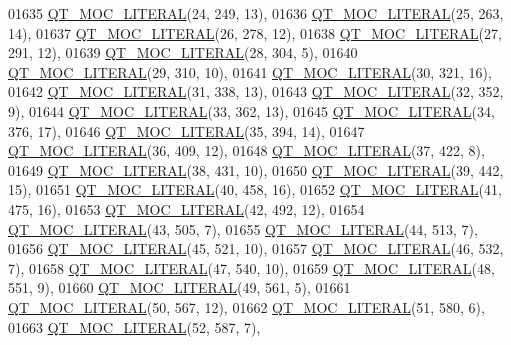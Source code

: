 \begin{DoxyCode}
01635 \hyperlink{a00016_a75bb9482d242cde0a06c9dbdc6b83abe}{QT\_MOC\_LITERAL}(24, 249, 13),
01636 \hyperlink{a00016_a75bb9482d242cde0a06c9dbdc6b83abe}{QT\_MOC\_LITERAL}(25, 263, 14),
01637 \hyperlink{a00016_a75bb9482d242cde0a06c9dbdc6b83abe}{QT\_MOC\_LITERAL}(26, 278, 12),
01638 \hyperlink{a00016_a75bb9482d242cde0a06c9dbdc6b83abe}{QT\_MOC\_LITERAL}(27, 291, 12),
01639 \hyperlink{a00016_a75bb9482d242cde0a06c9dbdc6b83abe}{QT\_MOC\_LITERAL}(28, 304, 5),
01640 \hyperlink{a00016_a75bb9482d242cde0a06c9dbdc6b83abe}{QT\_MOC\_LITERAL}(29, 310, 10),
01641 \hyperlink{a00016_a75bb9482d242cde0a06c9dbdc6b83abe}{QT\_MOC\_LITERAL}(30, 321, 16),
01642 \hyperlink{a00016_a75bb9482d242cde0a06c9dbdc6b83abe}{QT\_MOC\_LITERAL}(31, 338, 13),
01643 \hyperlink{a00016_a75bb9482d242cde0a06c9dbdc6b83abe}{QT\_MOC\_LITERAL}(32, 352, 9),
01644 \hyperlink{a00016_a75bb9482d242cde0a06c9dbdc6b83abe}{QT\_MOC\_LITERAL}(33, 362, 13),
01645 \hyperlink{a00016_a75bb9482d242cde0a06c9dbdc6b83abe}{QT\_MOC\_LITERAL}(34, 376, 17),
01646 \hyperlink{a00016_a75bb9482d242cde0a06c9dbdc6b83abe}{QT\_MOC\_LITERAL}(35, 394, 14),
01647 \hyperlink{a00016_a75bb9482d242cde0a06c9dbdc6b83abe}{QT\_MOC\_LITERAL}(36, 409, 12),
01648 \hyperlink{a00016_a75bb9482d242cde0a06c9dbdc6b83abe}{QT\_MOC\_LITERAL}(37, 422, 8),
01649 \hyperlink{a00016_a75bb9482d242cde0a06c9dbdc6b83abe}{QT\_MOC\_LITERAL}(38, 431, 10),
01650 \hyperlink{a00016_a75bb9482d242cde0a06c9dbdc6b83abe}{QT\_MOC\_LITERAL}(39, 442, 15),
01651 \hyperlink{a00016_a75bb9482d242cde0a06c9dbdc6b83abe}{QT\_MOC\_LITERAL}(40, 458, 16),
01652 \hyperlink{a00016_a75bb9482d242cde0a06c9dbdc6b83abe}{QT\_MOC\_LITERAL}(41, 475, 16),
01653 \hyperlink{a00016_a75bb9482d242cde0a06c9dbdc6b83abe}{QT\_MOC\_LITERAL}(42, 492, 12),
01654 \hyperlink{a00016_a75bb9482d242cde0a06c9dbdc6b83abe}{QT\_MOC\_LITERAL}(43, 505, 7),
01655 \hyperlink{a00016_a75bb9482d242cde0a06c9dbdc6b83abe}{QT\_MOC\_LITERAL}(44, 513, 7),
01656 \hyperlink{a00016_a75bb9482d242cde0a06c9dbdc6b83abe}{QT\_MOC\_LITERAL}(45, 521, 10),
01657 \hyperlink{a00016_a75bb9482d242cde0a06c9dbdc6b83abe}{QT\_MOC\_LITERAL}(46, 532, 7),
01658 \hyperlink{a00016_a75bb9482d242cde0a06c9dbdc6b83abe}{QT\_MOC\_LITERAL}(47, 540, 10),
01659 \hyperlink{a00016_a75bb9482d242cde0a06c9dbdc6b83abe}{QT\_MOC\_LITERAL}(48, 551, 9),
01660 \hyperlink{a00016_a75bb9482d242cde0a06c9dbdc6b83abe}{QT\_MOC\_LITERAL}(49, 561, 5),
01661 \hyperlink{a00016_a75bb9482d242cde0a06c9dbdc6b83abe}{QT\_MOC\_LITERAL}(50, 567, 12),
01662 \hyperlink{a00016_a75bb9482d242cde0a06c9dbdc6b83abe}{QT\_MOC\_LITERAL}(51, 580, 6),
01663 \hyperlink{a00016_a75bb9482d242cde0a06c9dbdc6b83abe}{QT\_MOC\_LITERAL}(52, 587, 7),

\end{DoxyCode}
